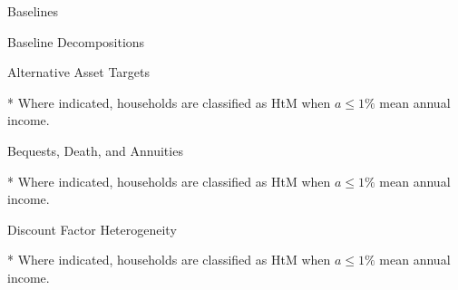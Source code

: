 \documentclass{article}
\begin{document}
\begin{table}
\centering
\caption{Baselines}

\end{table}

\begin{table}
\centering
\caption{Baseline Decompositions}

\end{table}

\clearpage

\begin{table}[h]
\caption{Alternative Asset Targets}
\begin{threeparttable}
\centering


\begin{tablenotes}
	\item[*] Where indicated, households are classified as HtM when $a \leq 1\%$ mean annual income.
\end{tablenotes}
\end{threeparttable}
\end{table}

\begin{table}[h]
\caption{Bequests, Death, and Annuities}
\begin{threeparttable}
\centering


\begin{tablenotes}
	\item[*] Where indicated, households are classified as HtM when $a \leq 1\%$ mean annual income.
\end{tablenotes}
\end{threeparttable}
\end{table}

\begin{table}[h]
\caption{Discount Factor Heterogeneity}
\begin{threeparttable}
\centering


\begin{tablenotes}
	\item[*] Where indicated, households are classified as HtM when $a \leq 1\%$ mean annual income.
\end{tablenotes}
\end{threeparttable}
\end{table}
\end{document}
